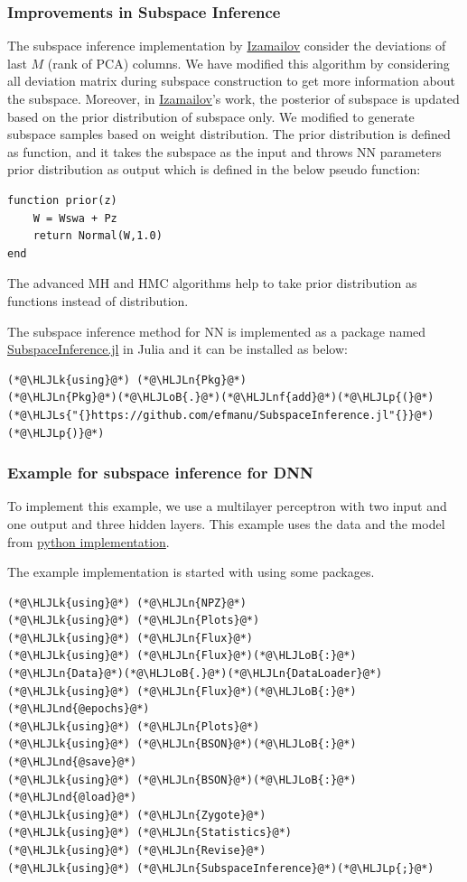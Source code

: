 \documentclass[12pt,a4paper]{article}
\newcommand{\HLJLk}[1]{\textcolor[RGB]{148,91,176}{\textbf{#1}}}
\newcommand{\HLJLn}[1]{#1}
\newcommand{\HLJLnd}[1]{\textcolor[RGB]{214,102,97}{#1}}
\newcommand{\HLJLnf}[1]{\textcolor[RGB]{66,102,213}{#1}}
\newcommand{\HLJLs}[1]{\textcolor[RGB]{201,61,57}{#1}}
\newcommand{\HLJLoB}[1]{\textcolor[RGB]{102,102,102}{\textbf{#1}}}
\newcommand{\HLJLp}[1]{#1}
\begin{document}
\subsubsection{Improvements in Subspace Inference}
The subspace inference implementation by \href{https://arxiv.org/abs/1907.07504}{Izamailov} consider the deviations of last $M$ (rank of PCA) columns. We have modified this algorithm by considering all deviation matrix during subspace construction to get more information about the subspace. Moreover, in \href{https://arxiv.org/abs/1907.07504}{Izamailov}'s work, the posterior of subspace is updated based on the prior distribution of subspace only. We modified to generate subspace samples based on weight distribution. The prior distribution is defined as function,  and it takes the  subspace as the input  and  throws NN parameters prior distribution as output which is defined in the below pseudo function:

\begin{verbatim}
function prior(z)
    W = Wswa + Pz
    return Normal(W,1.0)
end
\end{verbatim}
The advanced MH and HMC algorithms help to take prior distribution as functions instead of distribution.

The subspace inference method for NN is implemented as a package named \href{https://github.com/efmanu/SubspaceInference.jl}{SubspaceInference.jl} in Julia and it can be installed as below:


\begin{lstlisting}
(*@\HLJLk{using}@*) (*@\HLJLn{Pkg}@*)
(*@\HLJLn{Pkg}@*)(*@\HLJLoB{.}@*)(*@\HLJLnf{add}@*)(*@\HLJLp{(}@*)(*@\HLJLs{"{}https://github.com/efmanu/SubspaceInference.jl"{}}@*)(*@\HLJLp{)}@*)
\end{lstlisting}

\subsubsection{Example for subspace inference for DNN}
To implement this example, we use a multilayer perceptron with two input and one output  and three hidden layers. This example uses the data and the model from \href{https://github.com/wjmaddox/drbayes}{python implementation}. 

The example implementation is started with using some packages.


\begin{lstlisting}
(*@\HLJLk{using}@*) (*@\HLJLn{NPZ}@*)
(*@\HLJLk{using}@*) (*@\HLJLn{Plots}@*)
(*@\HLJLk{using}@*) (*@\HLJLn{Flux}@*)
(*@\HLJLk{using}@*) (*@\HLJLn{Flux}@*)(*@\HLJLoB{:}@*) (*@\HLJLn{Data}@*)(*@\HLJLoB{.}@*)(*@\HLJLn{DataLoader}@*)
(*@\HLJLk{using}@*) (*@\HLJLn{Flux}@*)(*@\HLJLoB{:}@*) (*@\HLJLnd{@epochs}@*)
(*@\HLJLk{using}@*) (*@\HLJLn{Plots}@*)
(*@\HLJLk{using}@*) (*@\HLJLn{BSON}@*)(*@\HLJLoB{:}@*) (*@\HLJLnd{@save}@*)
(*@\HLJLk{using}@*) (*@\HLJLn{BSON}@*)(*@\HLJLoB{:}@*) (*@\HLJLnd{@load}@*)
(*@\HLJLk{using}@*) (*@\HLJLn{Zygote}@*)
(*@\HLJLk{using}@*) (*@\HLJLn{Statistics}@*)
(*@\HLJLk{using}@*) (*@\HLJLn{Revise}@*)
(*@\HLJLk{using}@*) (*@\HLJLn{SubspaceInference}@*)(*@\HLJLp{;}@*)
\end{lstlisting}
\end{document}
